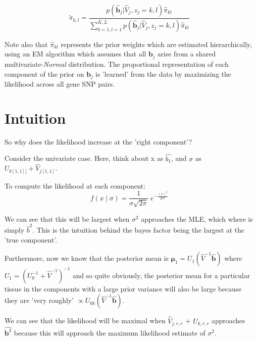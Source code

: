 \documentclass[10pt]{article}
\begin{document}
 
 \begin{equation}
 \label{post.pi}
\tilde \pi_{k,l} =\frac{ p(\hat{\bm{b}}_{j}| \hat{V}_{j}, z_{j}=k,l) \hat \pi_{kl}} {\sum_{k=1,l=1}^{K,L} p(\hat{\bm{b}}_{j}| \hat{V}_{j}, z_{j}=k,l) \hat\pi_{kl}}
\end{equation}

Note also that $\hat\pi_{kl}$ represents the prior weights which are estimated hierarchically, using an EM algorithm which assumes that all $\bm{b}_{j}$ arise from a shared multivariate-{\it Normal} distribution. The proportional representation of each component of the prior on $\bm{b}_{j} $ is 'learned' from the data by maximizing the likelihood across all gene SNP pairs. %


\section{Intuition}



So why does the likelihood increase at the 'right component'?

Consider the univariate case. Here, think about x as $\hat{b_{1}}$, and $\sigma$ as $U_{k[1,1]]} + \hat{V}_{j[1,1]}$.  

To compute the likelihood at each component: 
\begin{equation}
f(x \; | \; \sigma) = \frac{1}{\sigma\sqrt{2\pi} } \; e^{ -\frac{(x)^2}{2\sigma^2} }
\end{equation}
  
We can see that this will be largest when $\sigma^{2}$ approaches the MLE, which where is simply $\hat{b}^{2}$. 
This is the intuition behind the bayes factor being the largest at the 'true component'. 
  
Furthermore, now we know that the posterior mean is $\bm{\mu}_{1} = U_{1} (\hat{V}^{-1} \hat{\bm{b}})$ where $U_{1} = (U_{0}^{-1} + \hat{V}^{-1})^{-1}$ and so quite obviously, the posterior mean for a particular tissue in the components with a large prior variance will also be large because they are 'very roughly' $\propto U_{0k} (\hat{V}^{-1} \hat{\bm{b}})$. 

We can see that the likelihood will be maximal when $\hat{V}_{j,r,r}$ + $U_{k,r,r}$ approaches $\hat{\bm{b}^{2}}$ because this will approach the maximum likelihood estimate of $\sigma^{2}$.
\end{document}
